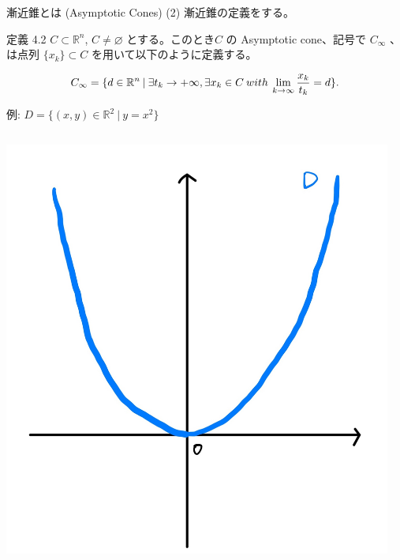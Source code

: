 \documentclass[aspectratio=169, dvipdfmx, 11pt]{beamer} %
\begin{document}
\begin{frame}{漸近錐とは (Asymptotic Cones) (2) }
  漸近錐の定義をする。
  \begin{block}{定義 4.2}
    $C \subset \mathbb{R}^n$, $C \neq \varnothing$ とする。このとき$C$ の Asymptotic cone、記号で $C_\infty$ 、は点列 $\{ x_k \} \subset C$ を用いて以下のように定義する。

    \begin{equation}
      C_\infty = \{ d \in
    \mathbb{R}^n \:|\: \exists t_k \rightarrow +\infty, \exists x_k \in C \:with\: \lim_{k \to \infty} \frac{x_k}{t_k} = d \}. \notag
    \end{equation}
  \end{block}

  例: $D = \{(x,y) \in \mathbb{R}^2 \:|\: y=x^2\}$

  \centering
  \begin{columns}
    \pause
    \begin{column}{0.48\textwidth}
      \includegraphics[keepaspectratio, scale=0.06]{figures/unbounded_example.jpg}
    \end{column}
    \pause
    \begin{column}{0.48\textwidth}

\end{column}
\end{columns}
\end{frame}
\end{document}
